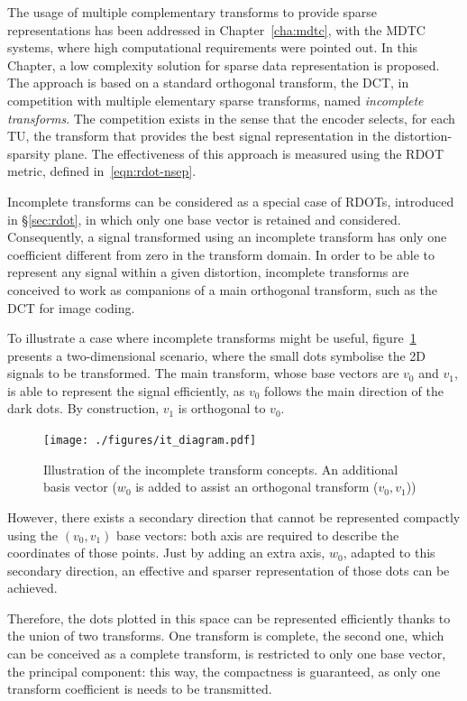 \documentclass[11pt,a4paper,openright,twoside]{book}
\numberwithin{equation}{section} %
\numberwithin{figure}{section} %
\numberwithin{table}{section} %
\begin{document}
The usage of multiple complementary transforms to provide sparse
representations has been addressed in Chapter~\ref{cha:mdtc}, with the
\ac{MDTC} systems, where high computational requirements were pointed out.
In this Chapter, a low complexity solution for sparse data representation is
proposed.
The approach is based on a standard orthogonal transform, the \acf{DCT}, in
competition with multiple elementary sparse transforms, named \emph{incomplete
transforms}.
The competition exists in the sense that the encoder selects, for each
\ac{TU}, the transform that provides the best signal representation in the
distortion-sparsity plane.
The effectiveness of this approach is measured using the \ac{RDOT} metric,
defined in~\ref{eqn:rdot-nsep}.

Incomplete transforms can be considered as a special case of \acfp{RDOT},
introduced in \S\ref{sec:rdot}, in which
only one base vector is retained and considered.
Consequently, a signal transformed using an incomplete transform has only one
coefficient different from zero in the transform domain.
In order to be able to represent any signal within a given distortion,
incomplete transforms are conceived to work as companions of a main orthogonal
transform, such as the \ac{DCT} for image coding.

To illustrate a case where incomplete transforms might be useful,
figure~\ref{fig:it_diagram} presents a two-dimensional scenario, where the
small dots symbolise the 2D signals to be transformed.
The main transform, whose base vectors are $v_0$ and $v_1$, is able to
represent the signal efficiently, as $v_0$ follows the main direction of the
dark dots.
By construction, $v_1$ is orthogonal to $v_0$.

\begin{figure}[tp]
	\centering
	\texttt{[image: ./figures/it\_diagram.pdf]}
	\caption{Illustration of the incomplete transform concepts.
	An additional basis vector ($w_0$ is added to assist an orthogonal
	transform ($v_0,v_1$))}
	\label{fig:it_diagram}
\end{figure}

However, there exists a secondary direction that cannot be represented
compactly using the $(v_0,v_1)$ base vectors:
both axis are required to describe the coordinates of those points.
Just by adding an extra axis, $w_0$, adapted to this secondary direction, an
effective and sparser representation of those dots can be achieved.

Therefore, the dots plotted in this space can be represented efficiently thanks
to the union of two transforms.
One transform is complete, the second one, which can be conceived as a
complete transform, is restricted to only one base vector, the principal
component:
this way, the compactness is guaranteed, as only one transform coefficient is
needs to be transmitted.
\end{document}
